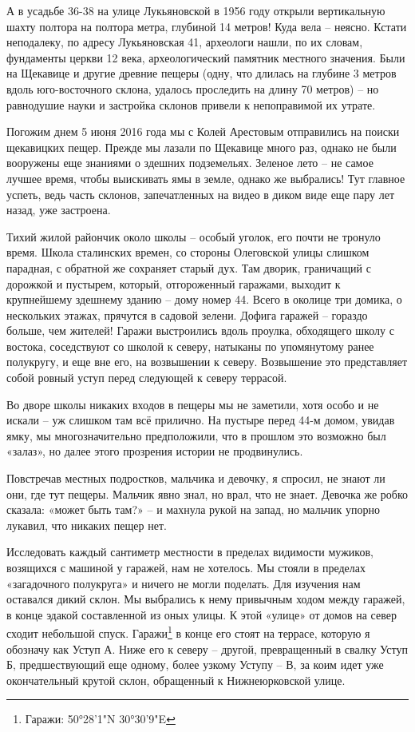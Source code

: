 А в усадьбе 36-38 на улице Лукьяновской в 1956 году открыли вертикальную шахту полтора на полтора метра, глубиной 14 метров! Куда вела – неясно. Кстати неподалеку, по адресу Лукьяновская 41, археологи нашли, по их словам, фундаменты церкви 12 века, археологический памятник местного значения. Были на Щекавице и другие древние пещеры (одну,  что длилась на глубине 3 метров вдоль юго-восточного склона, удалось проследить на длину 70 метров) – но равнодушие науки и застройка склонов привели к непоправимой их утрате.

Погожим днем 5 июня 2016 года мы с Колей Арестовым отправились на поиски щекавицких пещер. Прежде мы лазали по Щекавице много раз, однако не были вооружены еще знаниями о здешних подземельях. Зеленое лето – не самое лучшее время, чтобы выискивать ямы в земле, однако же выбрались! Тут главное успеть, ведь часть склонов, запечатленных на видео в диком виде еще пару лет назад, уже застроена.

Тихий жилой райончик около школы – особый уголок, его почти не тронуло время. Школа сталинских времен, со стороны Олеговской улицы слишком парадная, с обратной же сохраняет старый дух. Там дворик, граничащий с дорожкой и пустырем, который, отгороженный гаражами, выходит к крупнейшему здешнему зданию – дому номер 44. Всего в околице три домика, о нескольких этажах, прячутся в садовой зелени. Дофига гаражей – гораздо больше, чем жителей! Гаражи выстроились вдоль проулка, обходящего школу с востока, соседствуют со школой к северу, натыканы по упомянутому ранее полукругу, и еще вне его, на возвышении к северу. Возвышение это представляет собой ровный уступ перед следующей к северу террасой.

Во дворе школы никаких входов в пещеры мы не заметили, хотя особо и не искали – уж слишком там всё прилично. На пустыре перед 44-м домом, увидав ямку, мы многозначительно предположили, что в прошлом это возможно был «залаз», но далее этого прозрения истории не продвинулись.

Повстречав местных подростков, мальчика и девочку, я спросил, не знают ли они, где тут пещеры. Мальчик явно знал, но врал, что не знает. Девочка же робко сказала: «может быть там?» – и махнула рукой на запад, но мальчик упорно лукавил, что никаких пещер нет.
 
Исследовать каждый сантиметр местности в пределах видимости мужиков, возящихся с машиной у гаражей, нам не хотелось. Мы стояли в пределах «загадочного полукруга» и ничего не могли поделать. Для изучения нам оставался дикий склон. Мы выбрались к нему привычным ходом между гаражей, в конце эдакой составленной из оных улицы. К этой «улице» от домов на север сходит небольшой спуск. Гаражи\footnote{Гаражи: 50°28'1"N 30°30'9"E} в конце его стоят на террасе, которую я обозначу как Уступ А. Ниже его к северу – другой, превращенный в свалку Уступ Б, предшествующий еще одному, более узкому Уступу – В, за коим идет уже окончательный крутой склон, обращенный к Нижнеюрковской улице.

